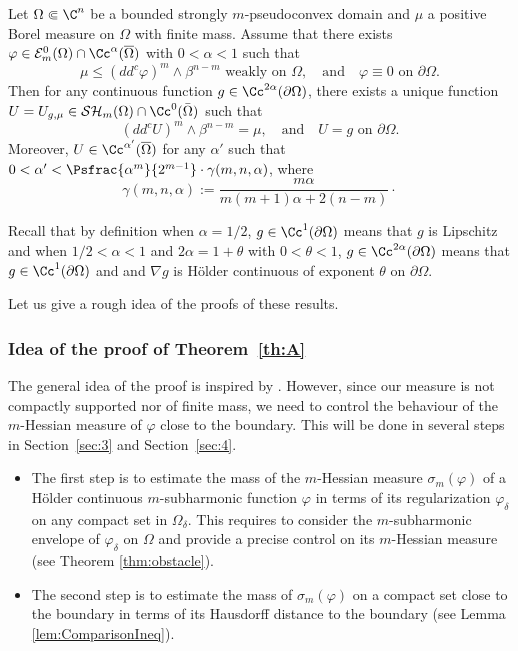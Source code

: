 \begin{theo}\label{th:B}
Let $\Omega \Subset \C^n$ be a bounded strongly $m$-pseudoconvex domain and $\mu $ a positive Borel measure on $\Omega$ with finite mass. Assume that there exists $\varphi\in \mathcal{E}^0_m(\Omega)\cap\Cc^{\alpha}(\overline\Omega)$ with $0 < \alpha < 1$ such that
\begin{equation} \label{eq:subsol}
\mu \leq (dd^c\varphi)^m\wedge\beta^{n-m} \text{ weakly on }\Omega, \quad \text{and}\quad \varphi \equiv 0 \text{ on }\partial \Omega.
\end{equation}
Then for any continuous function $g \in \Cc^{2 \alpha} (\partial \Omega)$, there exists a unique function $U = U_{g,\mu} \in \mathcal{SH}_m (\Omega) \cap \Cc^{0} (\bar{\Omega})$ such that
\[
(dd^c U)^m\wedge\beta^{n-m} = \mu, \quad\text{and}\quad U = g \text{ on } \partial \Omega.
\]
Moreover, $U \in \Cc^{\alpha'}(\overline\Omega)$ for any $\alpha'$ such that $0 < \alpha' < \Psfrac{\alpha^m}{2^{m - 1}}\cdot \gamma (m,n,\alpha)$, where
\[
\gamma (m,n,\alpha):= \frac{m \alpha}{ m (m + 1) \alpha + 2 (n-m)}\cdot
\]
\end{theo}

Recall that by definition when $\alpha = 1 \slash 2$, $g \in \Cc^1 (\partial \Omega)$ means that $g$ is Lipschitz and when $1 \slash 2 < \alpha <1$ and $2 \alpha = 1 + \theta$ with $0 < \theta < 1$, $ g \in \Cc^{2 \alpha} (\partial \Omega)$ means that $g \in \Cc^1 (\partial \Omega)$ and and $\nabla g$ is Hölder continuous of exponent $\theta$ on $\partial \Omega$.

Let us give a rough idea of the proofs of these results.

\subsubsection*{Idea of the proof of Theorem~\ref{th:A}}
The general idea of the proof is inspired by \cite{KN19}. However, since our measure is not compactly supported nor of finite mass, we need to control the behaviour of the $m$-Hessian measure of $\varphi$ close to the boundary. This will be done in several steps in Section~\ref{sec:3} and Section~\ref{sec:4}.
\begin{itemize}
\item
The first step is to estimate the mass of the $m$-Hessian measure $\sigma_m (\varphi)$ of a Hölder continuous $m$-subharmonic function $\varphi$ in terms of its regularization $\varphi_\delta$ on any compact set in $\Omega_\delta$. This requires to consider the $m$-subharmonic envelope of $\varphi_\delta$ on $\Omega$ and provide a precise control on its $m$-Hessian measure (see Theorem \ref{thm:obstacle}).

\item
The second step is to estimate the mass of $\sigma_m (\varphi)$ on a compact set close to the boundary in terms of its Hausdorff distance to the boundary (see Lemma \ref{lem:ComparisonIneq}).
\end{itemize}

